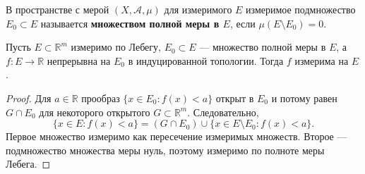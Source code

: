 \label{ticket:27}

\begin{definition}
В пространстве с мерой $(X,\mathcal A,\mu)$ для измеримого $E$ измеримое подмножество $E_0\subset E$ называется \textbf{множеством полной меры в $E$}, если $\mu(E\setminus E_0)=0$.
\end{definition}

\begin{theorem}
Пусть $E\subset\mathbb R^m$ измеримо по Лебегу, $E_0\subset E$ --- множество полной меры в $E$, а $f:E\to\mathbb R$ непрерывна на $E_0$ в индуцированной топологии.
Тогда $f$ измерима на $E$.
\end{theorem}

\begin{proof}
Для $a\in\mathbb R$ прообраз $\{x\in E_0:f(x)<a\}$ открыт в $E_0$ и потому равен $G\cap E_0$ для некоторого открытого $G\subset\mathbb R^m$.
Следовательно,
\[
  \{x\in E:f(x)<a\}
  =(G\cap E_0)\cup\{x\in E\setminus E_0:f(x)<a\}.
\]
Первое множество измеримо как пересечение измеримых множеств.
Второе --- подмножество множества меры нуль, поэтому измеримо по полноте меры Лебега.
\end{proof}
